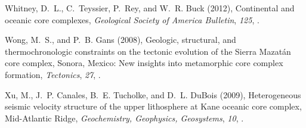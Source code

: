 \documentclass[draft,gc]{agutex}
\begin{document}
\begin{article}
\begin{thebibliography}{39}
Whitney, D.~L., C.~Teyssier, P.~Rey, and W.~R. Buck (2012), {Continental and
  oceanic core complexes}, \textit{Geological Society of America Bulletin},
  \textit{125}, .

Wong, M.~S., and P.~B. Gans (2008), {Geologic, structural, and
  thermochronologic constraints on the tectonic evolution of the Sierra
  Mazat\'{a}n core complex, Sonora, Mexico: New insights into metamorphic core
  complex formation}, \textit{Tectonics}, \textit{27},
  .

Xu, M., J.~P. Canales, B.~E. Tucholke, and D.~L. DuBois (2009), {Heterogeneous
  seismic velocity structure of the upper lithosphere at Kane oceanic core
  complex, Mid-Atlantic Ridge}, \textit{Geochemistry, Geophysics, Geosystems},
  \textit{10}, .

\end{thebibliography}



%

%
%
\end{article}
%
%
\end{document}
